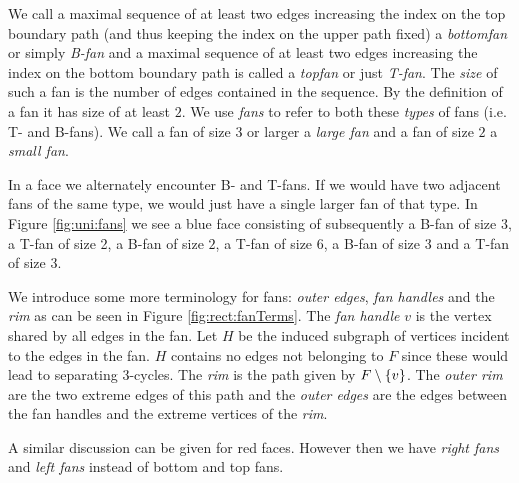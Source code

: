     We call a maximal sequence of at least two edges increasing the index on the top boundary path (and thus keeping the index on the upper path fixed) a \emph{bottomfan} or simply \emph{B-fan} and a maximal sequence of at least two edges increasing the index on the bottom boundary path is called a \emph{topfan} or just \emph{T-fan}.
    The \emph{size} of such a fan is the number of edges contained in the sequence. By the definition of a fan it has size of at least $2$.
    We use \emph{fans} to refer to both these \emph{types} of fans (i.e. T- and B-fans).
    We call a fan of size $3$ or larger a \emph{large fan} and a fan of size $2$ a \emph{small fan}.

    In a face we alternately encounter B- and T-fans. If we would have two adjacent fans of the same type, we would just have a single larger fan of that type.
    In Figure \ref{fig:uni:fans} we see a blue face consisting of subsequently a B-fan of size $3$, a T-fan of size 2, a B-fan of size $2$, a T-fan of size $6$, a B-fan of size $3$ and a T-fan of size $3$.


   We introduce some more terminology for fans: \emph{outer edges}, \emph{fan handles} and the \emph{rim} as can be seen in Figure \ref{fig:rect:fanTerms}. The \emph{fan handle} $v$ is the vertex shared by all edges in the fan. Let $H$ be the induced subgraph of vertices incident to the edges in the fan. $H$ contains no edges not belonging to $F$ since these would lead to separating 3-cycles. The \emph{rim} is the path given by $F\setminus \left\lbrace {v} \right\rbrace$.
   The \emph{outer rim} are the two extreme edges of this path and the \emph{outer edges} are the edges between the fan handles and the extreme vertices of the \emph{rim}.

   A similar discussion can be given for red faces. However then we have \emph{right fans} and \emph{left fans} instead of bottom and top fans.


